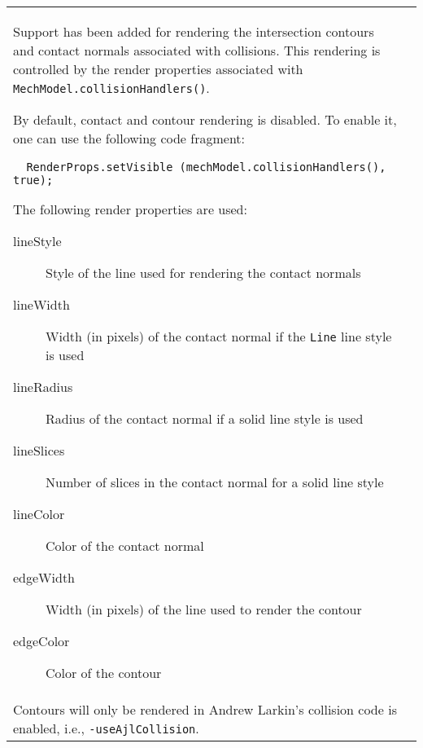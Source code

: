 \documentclass{article}
\begin{document}
\begin{tabular}{ll}
Support has been added for rendering the intersection contours and
contact normals associated with collisions. This rendering is
controlled by the render properties associated with
{\tt MechModel.collisionHandlers()}. 

By default, contact and contour rendering is disabled. To enable it,
one can use the following code fragment:

\begin{verbatim}
  RenderProps.setVisible (mechModel.collisionHandlers(), true);
\end{verbatim}

The following render properties are used:

\begin{description}

\item[lineStyle] \mbox{}

Style of the line used for rendering the contact normals

\item[lineWidth] \mbox{}

Width (in pixels) of the contact normal if the {\tt Line} line style is used

\item[lineRadius] \mbox{}

Radius of the contact normal if a solid line style is used

\item[lineSlices] \mbox{}

Number of slices in the contact normal for a solid line style

\item[lineColor] \mbox{}

Color of the contact normal

\item[edgeWidth] \mbox{}

Width (in pixels) of the line used to render the contour

\item[edgeColor] \mbox{}

Color of the contour

\end{description}

\begin{sideblock}
{\bf Note:}\\
Contours will only be rendered in Andrew Larkin's collision
code is enabled, i.e., {\tt -useAjlCollision}.
\end{sideblock}


\end{tabular}
\end{document}
